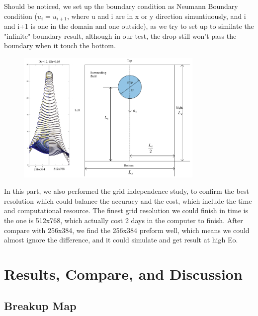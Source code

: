 \documentclass[12pt]{article}
\begin{document}
Should be noticed, we set up the boundary condition as Neumann Boundary condition ($u_i = u_{i+1}$, where u and i are in x or y direction simuntiuously, and i and i+1 is one in the domain and one outside), as we try to set up to similate the "infinite" boundary result, although in our test, the drop still won't pass the boundary when it touch the bottom. 
\begin{figure}[H]
    \centering
    \includegraphics[width=0.8\textwidth]{Latex/figures/Domain_grid_indep.jpg}
    \label{deformation}
\end{figure}


In this part, we also performed the grid independence study, to confirm the best resolution which could balance the accuracy and the cost, which include the time and computational resource. The finest grid resolution we could finish in time is the one is 512x768, which actually cost 2 days in the computer to finish. After compare with 256x384, we find the 256x384 preform well, which means we could almost ignore the difference, and it could simulate and get result at high Eo.









\section{Results, Compare, and Discussion}

\subsection{Breakup Map}
\end{document}
